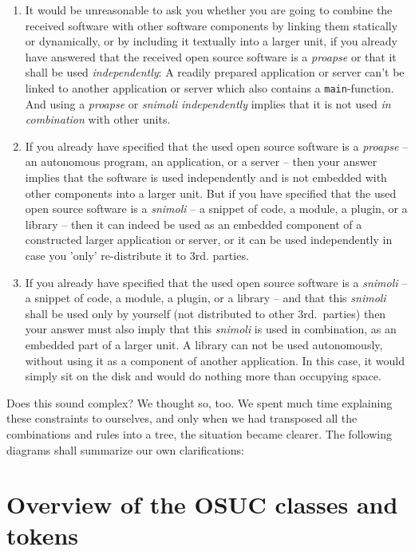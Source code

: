 \begin{enumerate}
  \label{InvalidFinderTokenCombinations}
  \item It would be unreasonable to ask you whether you are going to combine the
  received software with other software components by linking them statically or
  dynamically, or by including it textually into a larger unit, if you already
  have answered that the received open source software is a \emph{proapse} or
  that it shall be used \emph{independently}: A readily prepared application or
  server can't be linked to another application or server which also contains a
  \texttt{main}-function. And using a \emph{proapse} or \emph{snimoli}
  \emph{independently} implies that it is not used \emph{in combination} with
  other units.
  
  \item If you already have specified that the used open source software is a
  \emph{proapse} -- an autonomous program, an application, or a server -- then
  your answer implies that the software is used independently and is not
  embedded with other components into a larger unit. But if you have specified
  that the used open source software is a \emph{snimoli} -- a snippet of
  code, a module, a plugin, or a library -- then it can indeed be used as an
  embedded component of a constructed larger application or server, or it can be
  used independently in case you 'only' re-distribute it to 3rd. parties.
  
  \item If you already have specified that the used open source software is a
  \emph{snimoli} -- a snippet of code, a module, a plugin, or a library -- and
  that this \emph{snimoli} shall be used only by yourself (not distributed to
  other 3rd.\ parties) then your answer must also imply that this \emph{snimoli}
  is used in combination, as an embedded part of a larger unit. A library can
  not be used autonomously, without using it as a component of another
  application. In this case, it would simply sit on the disk and would do
  nothing more than occupying space.

\end{enumerate}

Does this sound complex? We thought so, too. We spent much time explaining these
constraints to ourselves, and only when we had transposed all the combinations
and rules into a tree, the situation became clearer. The following diagrams
shall summarize our own clarifications:

\section{Overview of the OSUC classes and tokens}



